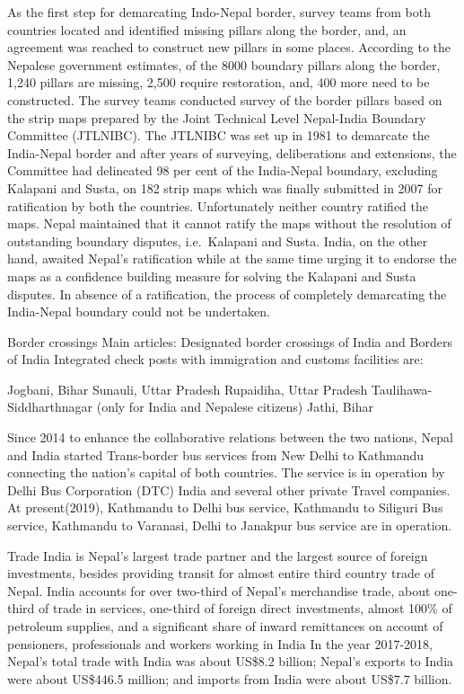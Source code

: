 \documentclass[
  openany]{book}
\begin{document}
As the first step for demarcating Indo-Nepal border, survey teams from both countries located and identified missing pillars along the border, and, an agreement was reached to construct new pillars in some places. According to the Nepalese government estimates, of the 8000 boundary pillars along the border, 1,240 pillars are missing, 2,500 require restoration, and, 400 more need to be constructed. The survey teams conducted survey of the border pillars based on the strip maps prepared by the Joint Technical Level Nepal-India Boundary Committee (JTLNIBC). The JTLNIBC was set up in 1981 to demarcate the India-Nepal border and after years of surveying, deliberations and extensions, the Committee had delineated 98 per cent of the India-Nepal boundary, excluding Kalapani and Susta, on 182 strip maps which was finally submitted in 2007 for ratification by both the countries. Unfortunately neither country ratified the maps. Nepal maintained that it cannot ratify the maps without the resolution of outstanding boundary disputes, i.e.~Kalapani and Susta. India, on the other hand, awaited Nepal's ratification while at the same time urging it to endorse the maps as a confidence building measure for solving the Kalapani and Susta disputes. In absence of a ratification, the process of completely demarcating the India-Nepal boundary could not be undertaken.

Border crossings
Main articles: Designated border crossings of India and Borders of India
Integrated check posts with immigration and customs facilities are:

Jogbani, Bihar
Sunauli, Uttar Pradesh
Rupaidiha, Uttar Pradesh
Taulihawa-Siddharthnagar (only for India and Nepalese citizens)
Jathi, Bihar

Since 2014 to enhance the collaborative relations between the two nations, Nepal and India started Trans-border bus services from New Delhi to Kathmandu connecting the nation's capital of both countries. The service is in operation by Delhi Bus Corporation (DTC) India and several other private Travel companies. At present(2019), Kathmandu to Delhi bus service, Kathmandu to Siliguri Bus service, Kathmandu to Varanasi, Delhi to Janakpur bus service are in operation.

Trade
India is Nepal's largest trade partner and the largest source of foreign investments, besides providing transit for almost entire third country trade of Nepal. India accounts for over two-third of Nepal's merchandise trade, about one-third of trade in services, one-third of foreign direct investments, almost 100\% of petroleum supplies, and a significant share of inward remittances on account of pensioners, professionals and workers working in India In the year 2017-2018, Nepal's total trade with India was about US\$8.2 billion; Nepal's exports to India were about US\$446.5 million; and imports from India were about US\$7.7 billion.
\end{document}
